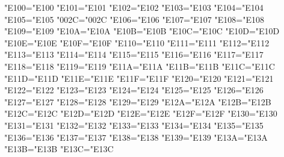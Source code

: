 %
%
%
%
\begingroup
\ifx\kanjiskip\undefined
\def\testengine#1#2!{\def\secondarg{#2}}\testengine Τ!\relax
\ifx\secondarg\empty
    \lccode"E100="E100
    \lccode"E101="E101
    \lccode"E102="E102
    \lccode"E103="E103
    \lccode"E104="E104
    \lccode"E105="E105
    \lccode"002C="002C
    \lccode"E106="E106
    \lccode"E107="E107
    \lccode"E108="E108
    \lccode"E109="E109
    \lccode"E10A="E10A
    \lccode"E10B="E10B
    \lccode"E10C="E10C
    \lccode"E10D="E10D
    \lccode"E10E="E10E
    \lccode"E10F="E10F
    \lccode"E110="E110
    \lccode"E111="E111
    \lccode"E112="E112
    \lccode"E113="E113
    \lccode"E114="E114
    \lccode"E115="E115
    \lccode"E116="E116
    \lccode"E117="E117
    \lccode"E118="E118
    \lccode"E119="E119
    \lccode"E11A="E11A
    \lccode"E11B="E11B
    \lccode"E11C="E11C
    \lccode"E11D="E11D
    \lccode"E11E="E11E
    \lccode"E11F="E11F
    \lccode"E120="E120
    \lccode"E121="E121
    \lccode"E122="E122
    \lccode"E123="E123
    \lccode"E124="E124
    \lccode"E125="E125
    \lccode"E126="E126
    \lccode"E127="E127
    \lccode"E128="E128
    \lccode"E129="E129
    \lccode"E12A="E12A
    \lccode"E12B="E12B
    \lccode"E12C="E12C
    \lccode"E12D="E12D
    \lccode"E12E="E12E
    \lccode"E12F="E12F
    \lccode"E130="E130
    \lccode"E131="E131
    \lccode"E132="E132
    \lccode"E133="E133
    \lccode"E134="E134
    \lccode"E135="E135
    \lccode"E136="E136
    \lccode"E137="E137
    \lccode"E138="E138
    \lccode"E139="E139
    \lccode"E13A="E13A
    \lccode"E13B="E13B
    \lccode"E13C="E13C
